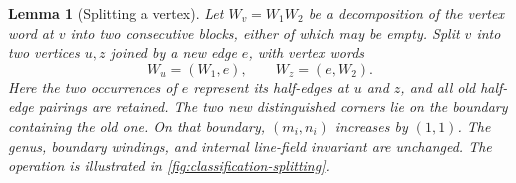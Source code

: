 \documentclass[11pt]{amsart}
\theoremstyle{definition}
\theoremstyle{plain}
\newtheorem{lemma}[lemma]{Lemma}
\theoremstyle{definition}
\theoremstyle{definition}
\begin{document}
\begin{lemma}[Splitting a vertex]
\label{lem:classification-splitting}
Let $W_v=W_1W_2$ be a decomposition of the vertex word at $v$
into two consecutive blocks, either of which may be empty.
Split $v$ into two vertices $u,z$ joined by a new edge $e$,
with vertex words
\begin{equation}
\label{eq:classification-splitting}
  W_u=(W_1,e),\qquad W_z=(e,W_2).
\end{equation}
Here the two occurrences of $e$ represent its half-edges at
$u$ and $z$, and all old half-edge pairings are retained.
The two new distinguished corners lie on the boundary
containing the old one.  On that boundary, $(m_i,n_i)$
increases by $(1,1)$.  The genus, boundary windings, and
internal line-field invariant are unchanged. The operation is illustrated in
\cref{fig:classification-splitting}.
\end{lemma}
\end{document}
